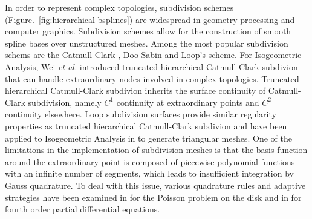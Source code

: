 In order to represent complex topologies, subdivision schemes (Figure.~\ref{fig:hierarchical-bsplines}) are widespread in geometry processing and computer graphics. Subdivision schemes allow for the construction of smooth spline bases over unstructured meshes. Among the most popular subdivision schems are the Catmull-Clark \cite{catmull_recursively_1978}, Doo-Sabin \cite{doo_behaviour_1978} and Loop's \cite{loop_smooth_1987} scheme. For Isogeometric Analysis, Wei \textit{et al.} \cite{wei_truncated_2015} introduced truncated hierarchical Catmull-Clark subdivion that can handle extraordinary nodes involved in complex topologies. Truncated hierarchical Catmull-Clark subdivion inherits the surface continuity of Catmull-Clark subdivision, namely $C^1$ continuity at extraordinary points and $C^2$ continuity elsewhere. Loop subdivision surfaces provide similar regularity properties as truncated hierarchical Catmull-Clark subdivion and have been applied to Isogeometric Analysis in \cite{kang_truncated_2016,pan_isogeometric_2015} to generate triangular meshes. One of the limitations in the implementation of subdivision meshes is that the basis function around the extraordinary point is composed of piecewise polynomial functions with an infinite number of segments, which leads to insufficient integration by Gauss quadrature. To deal with this issue, various quadrature rules and adaptive strategies have been examined in \cite{nguyen_comparative_2014} for the Poisson problem on the disk and in \cite{juttler_numerical_2016} for fourth order partial differential equations. \par

